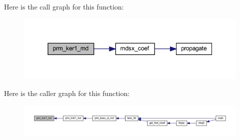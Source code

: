 Here is the call graph for this function\+:\nopagebreak
\begin{figure}[H]
\begin{center}
\leavevmode
\includegraphics[width=350pt]{Leroi_8f90_a3a9566c86f1c0b93bae5a6117621feae_cgraph}
\end{center}
\end{figure}
Here is the caller graph for this function\+:\nopagebreak
\begin{figure}[H]
\begin{center}
\leavevmode
\includegraphics[width=350pt]{Leroi_8f90_a3a9566c86f1c0b93bae5a6117621feae_icgraph}
\end{center}
\end{figure}
\mbox{\label{Leroi_8f90_a98390b637677e60abaa0fa6df3249f0b}} 
